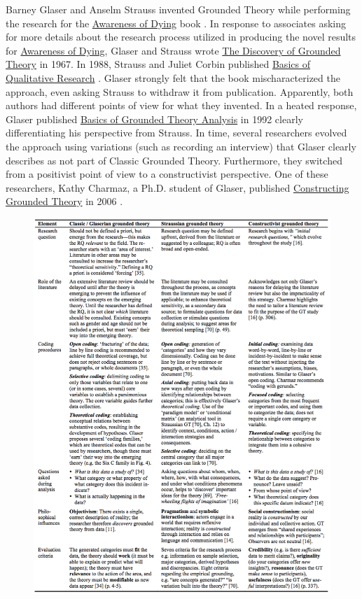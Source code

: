 Barney Glaser and Anselm Strauss invented Grounded Theory while performing the research for the \ul{Awareness of Dying} book \cite{GlaserAwarenessOfDying}. In response to associates asking for more details about the research process utilized in producing the novel results for \ul{Awareness of Dying}, Glaser and Strauss wrote \ul{The Discovery of Grounded Theory} \cite{GlaserDiscovery} in 1967. In 1988, Strauss and Juliet Corbin published \ul{Basics of Qualitative Research} \cite{Strauss1988Basics}. Glaser strongly felt that the book mischaracterized the approach, even asking Strauss to withdraw it from publication. Apparently, both authors had different points of view for what they invented. In a heated response, Glaser published \ul{Basics of Grounded Theory Analysis} in 1992 \cite{GlaserBasics} clearly differentiating his perspective from Strauss. In time, several researchers evolved the approach using variations (such as recording an interview) that Glaser clearly describes as not part of Classic Grounded Theory. Furthermore, they switched from a positivist point of view to a constructivist perspective. One of these researchers, Kathy Charmaz, a Ph.D. student of Glaser, published \ul{Constructing Grounded Theory} in 2006 \cite{Charmaz}. 

\begin{figure}[t]
\centering
{}
\label{GroundedTheoryComparison}
\includegraphics[width=6.4in]{grounded_theory_images/stohl_grounded_theory_comparison.png}
\end{figure}

